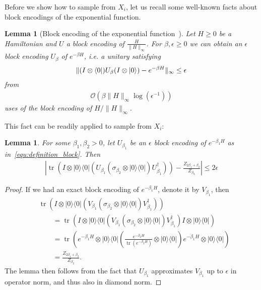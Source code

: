 \documentclass[aps,pra,amsmath,amssymb,twocolumn,10pt]{revtex4-2}
\newtheorem{lemma}[thm]{Lemma}
\theoremstyle{definition}
\def\lb{\left(}
\def\rb{\right)}
\newcommand{\ketbra}[2]{|#1\rangle\langle #2|}
\newcommand{\tr}[1]{\operatorname{tr}\lb#1\rb}
\begin{document}
Before we show how to sample from $X_{i}$, let us recall some well-known facts about block encodings of the exponential function.
\begin{lemma}[Block encoding of the exponential function~\cite{vanApeldoorn2020}]
	Let $H\geq 0$ be a Hamiltonian and $U$ a block encoding of $\tfrac{H}{\|H\|_\infty}$. For $\beta,\epsilon\geq0$ we can obtain an $\epsilon$ block encoding $U_\beta$ of $e^{-\beta H}$, i.e. a unitary satisfying
	\begin{align}\label{equ:definition_block}
		\|(I\otimes \bra{0})U_\beta(I\otimes \ket{0})-e^{-\beta H}\|_\infty\leq \epsilon
	\end{align}  
	from 
	\begin{align}
		\mathcal{O}(\beta\|H\|_\infty\log(\epsilon^{-1}))
	\end{align}
	uses of the block encoding of $H/\|H\|_\infty$.
\end{lemma}
This fact can be readily applied to sample from $X_i$:
\begin{lemma}\label{lemma:effect_block_encoding}
	For some $\beta_1,\beta_2>0$, let $U_{\beta_1}$ be an $\epsilon$ block encoding of $e^{-\beta_1 H}$ as in~\eqref{equ:definition_block}. Then
	\begin{align}
		\left|\tr{I \otimes \ketbra{0}{0}\left(U_{\beta_1}(\sigma_{\beta_2}\otimes\ketbra{0}{0})U_{\beta_1}^\dagger\right)} - \frac{Z_{2\beta_{1}+\beta_{2}}}{Z_{\beta_{2}}}\right| \leq 2\epsilon
	\end{align}
\end{lemma}
\begin{proof}
	If we had an exact block encoding of $e^{-\beta_{1} H}$, denote it by $V_{\beta_{1}}$, then
	\begin{align}
		&\tr{I \otimes \ketbra{0}{0}\left(V_{\beta_1}(\sigma_{\beta_2}\otimes\ketbra{0}{0})V_{\beta_1}^\dagger\right)}\\
		&\qquad =\tr{I \otimes \ketbra{0}{0}\left(V_{\beta_1}(\sigma_{\beta_2}\otimes\ketbra{0}{0})V_{\beta_1}^\dagger\right) I \otimes \ketbra{0}{0}}\\
		&\qquad =\tr{e^{-\beta_1 H}\otimes \ketbra{0}{0}\left(\frac{e^{-\beta_2H}}{\tr{e^{-\beta_2 H}}}\otimes \ketbra{0}{0}\right)e^{-\beta_1 H}\otimes \ketbra{0}{0}}\\
		&\qquad =\frac{Z_{2\beta_{1}+\beta_{2}}}{Z_{\beta_{2}}}.
	\end{align}
	The lemma then follows from the fact that $U_{\beta_1}$ approximates $V_{\beta_1}$ up to $\epsilon$ in operator norm, and thus also in diamond norm.
\end{proof}
\end{document}
